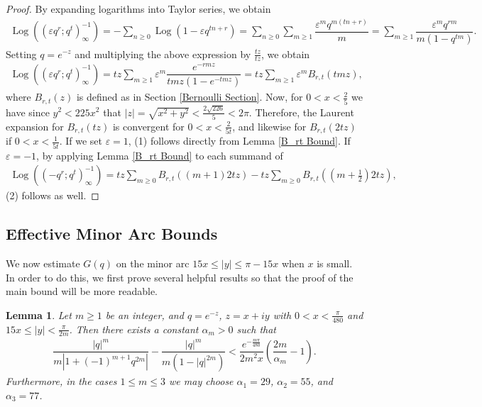 \documentclass[11pt,reqno]{amsart}
\theoremstyle{definition}
\theoremstyle{plain}
\newtheorem{lemma}[theorem]{Lemma}
\theoremstyle{named}
\DeclareMathOperator\Log{Log}
\numberwithin{equation}{section}
\theoremstyle{example}
\def\lp{\left(}
\def\rp{\right)}
\begin{document}
\begin{proof}
By expanding logarithms into Taylor series, we obtain
\begin{align} \label{Log Product Expansion}
    \Log\lp\lp \varepsilon q^r; q^t \rp_\infty^{-1}\rp = - \sum_{n \geq 0} \Log\lp 1 - \varepsilon q^{tn+r} \rp = \sum_{n \geq 0} \sum_{m \geq 1} \dfrac{\varepsilon^m q^{m(tn+r)}}{m} = \sum_{m \geq 1} \dfrac{\varepsilon^m q^{rm}}{m\lp 1 - q^{tm} \rp}.
\end{align}
Setting $q = e^{-z}$ and multiplying the above expression by $\frac{tz}{tz}$, we obtain
\begin{align*}
    \Log\lp\lp \varepsilon q^r; q^t \rp_\infty^{-1}\rp = tz \sum_{m \geq 1} \varepsilon^m \dfrac{e^{-rmz}}{tmz\lp 1 - e^{-tmz} \rp} = tz \sum_{m \geq 1} \varepsilon^m B_{r,t}(tmz),
\end{align*}
where $B_{r,t}(z)$ is defined as in Section \ref{Bernoulli Section}. Now, for $0 < x < \frac{2}{5}$ we have since $y^2 < 225x^2$ that $|z| = \sqrt{x^2 + y^2} < \frac{2\sqrt{226}}{5} < 2\pi$. Therefore, the Laurent expansion for $B_{r,t}(tz)$ is convergent for $0 < x < \frac{2}{5t}$, and likewise for $B_{r,t}(2tz)$ if $0 < x < \frac{1}{5t}$. If we set $\varepsilon = 1$, (1) follows directly from Lemma \ref{B_rt Bound}. If $\varepsilon = -1$, by applying Lemma \ref{B_rt Bound} to each summand of
\begin{align*}
    \Log\lp\lp -q^r; q^t \rp_\infty^{-1}\rp = tz \sum_{m \geq 0} B_{r,t}\lp (m+1) 2tz \rp - tz \sum_{m \geq 0} B_{r,t} \lp \lp m + \frac 12 \rp 2tz \rp,
\end{align*}
(2) follows as well.
\end{proof}

\subsection{Effective Minor Arc Bounds}

We now estimate $G(q)$ on the minor arc $15x \leq |y| \leq \pi - 15x$ when $x$ is small. In order to do this, we first prove several helpful results so that the proof of the main bound will be more readable.

\begin{lemma} \label{Alpha Estimations}
Let $m \geq 1$ be an integer, and $q = e^{-z}$, $z = x + iy$ with $0 < x < \frac{\pi}{480}$ and $15x \leq |y| < \frac{\pi}{2m}$. Then there exists a constant $\alpha_m > 0$ such that
\begin{align*}
    \dfrac{|q|^m}{m\left| 1 + \lp -1 \rp^{m+1} q^{2m} \right|} - \dfrac{|q|^m}{m\lp 1 - |q|^{2m} \rp} < \dfrac{e^{- \frac{m\pi}{480}}}{2m^2 x} \lp \dfrac{2m}{\alpha_m} - 1 \rp.
\end{align*}
Furthermore, in the cases $1 \leq m \leq 3$ we may choose $\alpha_1 = 29$, $\alpha_2 = 55$, and $\alpha_3 = 77$.
\end{lemma}
\end{document}
